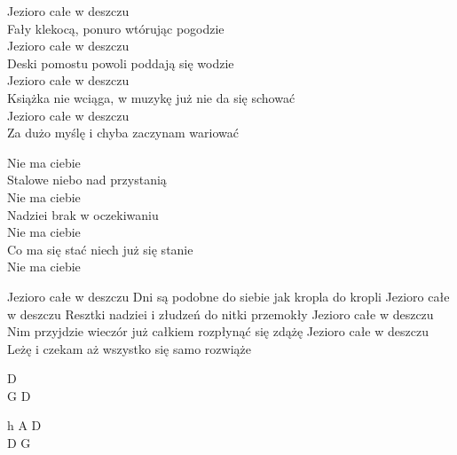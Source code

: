 \begin{text}
Jezioro całe w deszczu\\
Fały klekocą, ponuro wtórując pogodzie\\
Jezioro całe w deszczu\\
Deski pomostu powoli poddają się wodzie\\
Jezioro całe w deszczu\\
Książka nie wciąga, w muzykę już nie da się schować\\
Jezioro całe w deszczu\\
Za dużo myślę i chyba zaczynam wariować

\vin Nie ma ciebie\\
\vin Stalowe niebo nad przystanią\\
\vin Nie ma ciebie\\
\vin Nadziei brak w oczekiwaniu\\
\vin Nie ma ciebie\\
\vin Co ma się stać niech już się stanie\\
\vin Nie ma ciebie

Jezioro całe w deszczu
Dni są podobne do siebie jak kropla do kropli
Jezioro całe w deszczu
Resztki nadziei i złudzeń do nitki przemokły
Jezioro całe w deszczu
Nim przyjdzie wieczór już całkiem rozpłynąć się zdążę
Jezioro całe w deszczu
Leżę i czekam aż wszystko się samo rozwiąże
\end{text}
\begin{chord}
    D\\
    G D

    \hfill\break
    \hfill\break
    \hfill\break
    \hfill\break
    \hfill\break
    \hfill\break
    h A D\\
    D G
\end{chord}